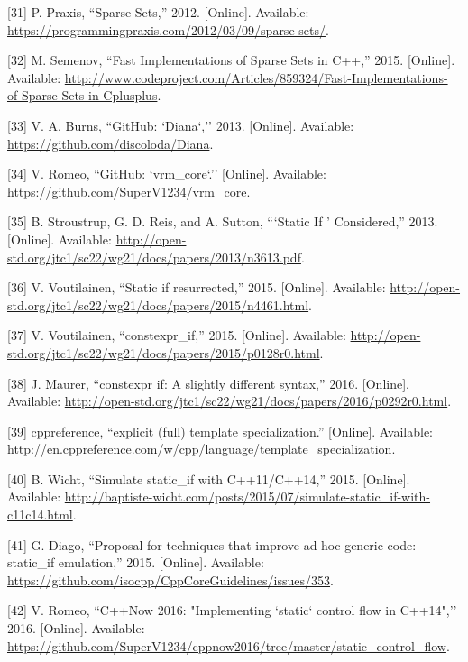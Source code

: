\documentclass[oneside, 12pt, a4paper, openany]{book}
\begin{document}
\hypertarget{ref-sparsesets_praxis}{}
{[}31{]} P. Praxis, ``Sparse Sets,'' 2012. {[}Online{]}. Available:
\url{https://programmingpraxis.com/2012/03/09/sparse-sets/}.

\hypertarget{ref-sparsesets_cpp}{}
{[}32{]} M. Semenov, ``Fast Implementations of Sparse Sets in C++,''
2015. {[}Online{]}. Available:
\url{http://www.codeproject.com/Articles/859324/Fast-Implementations-of-Sparse-Sets-in-Cplusplus}.

\hypertarget{ref-github_diana}{}
{[}33{]} V. A. Burns, ``GitHub: `Diana`,'' 2013. {[}Online{]}.
Available: \url{https://github.com/discoloda/Diana}.

\hypertarget{ref-github_vrmcore}{}
{[}34{]} V. Romeo, ``GitHub: `vrm\_core`.'' {[}Online{]}. Available:
\url{https://github.com/SuperV1234/vrm_core}.

\hypertarget{ref-isocpp_sif0}{}
{[}35{]} B. Stroustrup, G. D. Reis, and A. Sutton, ```Static If '
Considered,'' 2013. {[}Online{]}. Available:
\url{http://open-std.org/jtc1/sc22/wg21/docs/papers/2013/n3613.pdf}.

\hypertarget{ref-isocpp_sif1}{}
{[}36{]} V. Voutilainen, ``Static if resurrected,'' 2015. {[}Online{]}.
Available:
\url{http://open-std.org/jtc1/sc22/wg21/docs/papers/2015/n4461.html}.

\hypertarget{ref-isocpp_sif2}{}
{[}37{]} V. Voutilainen, ``constexpr\_if,'' 2015. {[}Online{]}.
Available:
\url{http://open-std.org/jtc1/sc22/wg21/docs/papers/2015/p0128r0.html}.

\hypertarget{ref-isocpp_sif3}{}
{[}38{]} J. Maurer, ``constexpr if: A slightly different syntax,'' 2016.
{[}Online{]}. Available:
\url{http://open-std.org/jtc1/sc22/wg21/docs/papers/2016/p0292r0.html}.

\hypertarget{ref-cppreference_ets}{}
{[}39{]} cppreference, ``explicit (full) template specialization.''
{[}Online{]}. Available:
\url{http://en.cppreference.com/w/cpp/language/template_specialization}.

\hypertarget{ref-sif0}{}
{[}40{]} B. Wicht, ``Simulate static\_if with C++11/C++14,'' 2015.
{[}Online{]}. Available:
\url{http://baptiste-wicht.com/posts/2015/07/simulate-static_if-with-c11c14.html}.

\hypertarget{ref-sif1}{}
{[}41{]} G. Diago, ``Proposal for techniques that improve ad-hoc generic
code: static\_if emulation,'' 2015. {[}Online{]}. Available:
\url{https://github.com/isocpp/CppCoreGuidelines/issues/353}.

\hypertarget{ref-sif2}{}
{[}42{]} V. Romeo, ``C++Now 2016: "Implementing `static` control flow in
C++14",'' 2016. {[}Online{]}. Available:
\url{https://github.com/SuperV1234/cppnow2016/tree/master/static_control_flow}.
\end{document}
